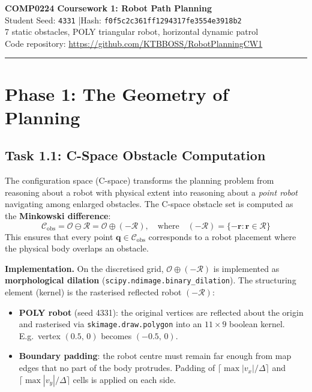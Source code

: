 \documentclass[11pt,a4paper]{article}
\begin{document}
\begin{center}
    {\LARGE\bfseries COMP0224 Coursework 1: Robot Path Planning}\\[0.6em]
    {\large Student Seed: \texttt{4331} \enspace|\enspace Hash: \texttt{f0f5c2c361ff1294317fe3554e3918b2}}\\[0.3em]
    {\normalsize 7 static obstacles, POLY triangular robot, horizontal dynamic patrol}\\[0.2em]
    {\small Code repository: \url{https://github.com/KTBBOSS/RobotPlanningCW1}}
\end{center}
\vspace{0.3em}\hrule\vspace{0.8em}

\section{Phase 1: The Geometry of Planning}

\subsection{Task 1.1: C-Space Obstacle Computation}

The configuration space (C-space) transforms the planning problem from reasoning about a robot with physical extent into reasoning about a \emph{point robot} navigating among enlarged obstacles. The C-space obstacle set is computed as the \textbf{Minkowski difference}:
\[
    \mathcal{C}_{\mathrm{obs}} = \mathcal{O} \ominus \mathcal{R} = \mathcal{O} \oplus (-\mathcal{R}), \quad\text{where}\quad (-\mathcal{R}) = \{-\mathbf{r} : \mathbf{r} \in \mathcal{R}\}
\]
This ensures that every point $\mathbf{q} \in \mathcal{C}_{\mathrm{obs}}$ corresponds to a robot placement where the physical body overlaps an obstacle.

\textbf{Implementation.}
On the discretised grid, $\mathcal{O} \oplus (-\mathcal{R})$ is implemented as \textbf{morphological dilation} (\texttt{scipy.ndimage.binary\_dilation}). The structuring element (kernel) is the rasterised reflected robot $(-\mathcal{R})$:

\begin{itemize}[nosep]
    \item \textbf{POLY robot} (seed 4331): the original vertices are reflected about the origin and rasterised via \texttt{skimage.draw.polygon} into an $11{\times}9$ boolean kernel.  E.g.\ vertex $(0.5,\,0)$ becomes $(-0.5,\,0)$.
    \item \textbf{Boundary padding}: the robot centre must remain far enough from map edges that no part of the body protrudes. Padding of $\lceil \max|v_x|/\Delta \rceil$ and $\lceil \max|v_y|/\Delta \rceil$ cells is applied on each side.
\end{itemize}
\end{document}
